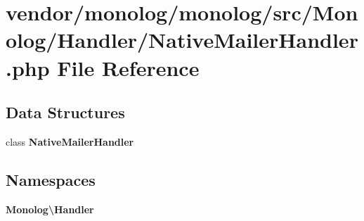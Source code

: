 \section{vendor/monolog/monolog/src/\+Monolog/\+Handler/\+Native\+Mailer\+Handler.php File Reference}
\label{_native_mailer_handler_8php}
\subsection*{Data Structures}
\begin{DoxyCompactItemize}
\item 
class {\bf Native\+Mailer\+Handler}
\end{DoxyCompactItemize}
\subsection*{Namespaces}
\begin{DoxyCompactItemize}
\item 
 {\bf Monolog\textbackslash{}\+Handler}
\end{DoxyCompactItemize}
